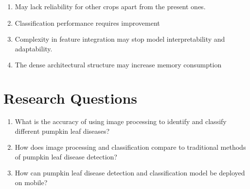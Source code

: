 {\begin{enumerate}
	\item May lack reliability for other crops apart from the present ones.
	
	\item Classification performance requires improvement
	
	\item Complexity in feature integration may stop model interpretability and adaptability.
	
	\item The dense architectural structure may increase memory consumption
\end{enumerate}

\section{Research Questions}
\begin{enumerate}
	\item What is the accuracy of using image processing to identify and classify different pumpkin leaf diseases?
	
	\item  How does image processing and classification compare to traditional methods of pumpkin leaf disease detection?
	
	\item How can pumpkin leaf disease detection and classification model be deployed on mobile?
\end{enumerate}

}
